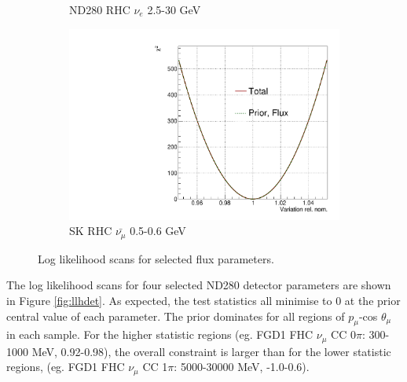 \begin{figure}
\begin{subfigure}{.49\textwidth}
  \caption{ND280 RHC $\nu_e$ 2.5-30 GeV}
\end{subfigure}
\begin{subfigure}{.49\textwidth}
  \centering
  \includegraphics[width=0.7\linewidth]{figs/llh/b_52_llh.pdf}
  \caption{SK RHC $\bar{\nu_{\mu}}$ 0.5-0.6 GeV}
\end{subfigure}
\caption{Log likelihood scans for selected flux parameters.}
\label{fig:llhflux}
\end{figure}

The log likelihood scans for four selected ND280 detector parameters are shown in Figure \ref{fig:llhdet}. As expected, the test statistics all minimise to 0 at the prior central value of each parameter. The prior dominates for all regions of $p_{\mu}$-cos $\theta_{\mu}$ in each sample. For the higher statistic regions (eg. FGD1 FHC $\nu_{\mu}$ CC 0$\pi$: 300-1000 MeV, 0.92-0.98), the overall constraint is larger than for the lower statistic regions, (eg. FGD1 FHC $\nu_{\mu}$ CC 1$\pi$: 5000-30000 MeV, -1.0-0.6). 

